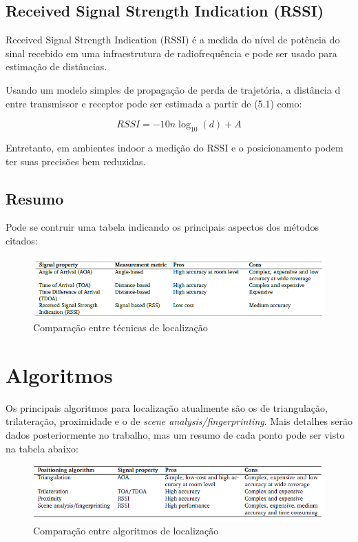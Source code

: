 \subsection{Received Signal Strength Indication (RSSI)}
Received Signal Strength Indication (RSSI) é a medida do nível de potência do sinal recebido em uma infraestrutura de radiofrequência e pode ser usado para estimação de distâncias.

Usando um modelo simples de propagação de perda de trajetória, a distância d entre transmissor e receptor pode ser estimada a partir de (5.1) como:

\begin{equation} \label{eq:1}
RSSI = -10n\log_{10} (d) + A 
\end{equation}

Entretanto, em ambientes indoor a medição do RSSI e o posicionamento podem ter suas precisões bem reduzidas. \cite{art1}

\subsection{Resumo}
Pode se contruir uma tabela indicando os principais aspectos dos métodos citados:

\begin{figure}[H]
	\centering 
	\includegraphics[scale = 1]{images/signal_table.png}
	\caption{Comparação entre técnicas de localização \cite{art1}}
	\label{fig:signal_table.png}
\end{figure}

\section{Algoritmos}

Os principais algoritmos para localização atualmente são os de triangulação, trilateração, proximidade e o de \textit{scene analysis/fingerprinting}. Mais detalhes serão dados posteriormente no trabalho, mas um resumo de cada ponto pode ser visto na tabela abaixo:

\begin{figure}[H]
	\centering 
	\includegraphics[scale = 1]{images/algorithms_table.png}
	\caption{Comparação entre algoritmos de localização \cite{art1}}
	\label{fig:algorithms_table.png}
\end{figure}

